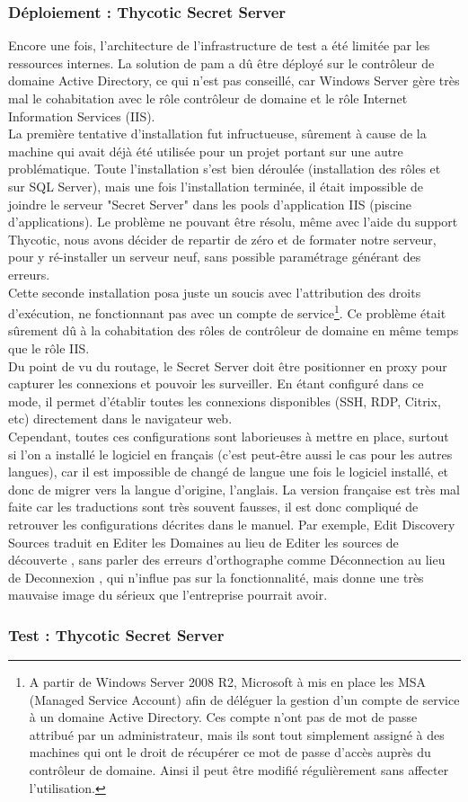 \subsubsection{Déploiement : Thycotic Secret Server}
\label{par:depss}

Encore une fois, l'architecture de l'infrastructure de test a été limitée par les ressources internes. La solution de \gls{pam} a dû être déployé sur le contrôleur de domaine Active Directory, ce qui n'est pas conseillé, car Windows Server gère très mal le cohabitation avec le rôle contrôleur de domaine et le rôle Internet Information Services (IIS).\\
La première tentative d'installation fut infructueuse, sûrement à cause de la machine qui avait déjà été utilisée pour un projet portant sur une autre problématique. Toute l'installation s'est bien déroulée (installation des rôles et sur SQL Server), mais une fois l'installation terminée, il était impossible de joindre le serveur "Secret Server" dans les pools d'application IIS (piscine d'applications). Le problème ne pouvant être résolu, même avec l'aide du support Thycotic, nous avons décider de repartir de zéro et de formater notre serveur, pour y ré-installer un serveur neuf, sans possible paramétrage générant des erreurs.\\
Cette seconde installation posa juste un soucis avec l'attribution des droits d'exécution, ne fonctionnant pas avec un compte de service\footnote{A partir de Windows Server 2008 R2, Microsoft à mis en place les MSA (Managed Service Account) afin de déléguer la gestion d'un compte de service à un domaine Active Directory. Ces compte n'ont pas de mot de passe attribué par un administrateur, mais ils sont tout simplement assigné à des machines qui ont le droit de récupérer ce mot de passe d'accès auprès du contrôleur de domaine. Ainsi il peut être modifié régulièrement sans affecter l'utilisation.}. Ce problème était sûrement dû à la cohabitation des rôles de contrôleur de domaine en même temps que le rôle IIS.\\
Du point de vu du routage, le Secret Server doit être positionner en proxy pour capturer les connexions et pouvoir les surveiller. En étant configuré dans ce mode, il permet d'établir toutes les connexions disponibles (SSH, RDP, Citrix, etc) directement dans le navigateur web.\\
Cependant, toutes ces configurations sont laborieuses à mettre en place, surtout si l'on a installé le logiciel en français (c'est peut-être aussi le cas pour les autres langues), car il est impossible de changé de langue une fois le logiciel installé, et donc de migrer vers la langue d'origine, l'anglais. La version française est très mal faite car les traductions sont très souvent fausses, il est donc compliqué de retrouver les configurations décrites dans le manuel. Par exemple, \og Edit Discovery Sources \fg{} traduit en \og Editer les Domaines \fg{} au lieu de \og Editer les sources de découverte \fg{}, sans parler des erreurs d'orthographe comme \og Déconnection \fg{} au lieu de \og Deconnexion \fg{}, qui n'influe pas sur la fonctionnalité, mais donne une très mauvaise image du sérieux que l'entreprise pourrait avoir.

\subsubsection{Test : Thycotic Secret Server}
\label{par:testss}